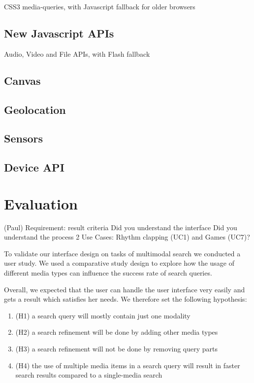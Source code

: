 \documentclass[runningheads,a4paper]{llncs} \usepackage[utf8]{inputenc}
\begin{document}
CSS3 media-queries, with Javascript fallback for older browsers

\subsection{New Javascript APIs}

 Audio, Video and File APIs, with Flash fallback

\subsection{Canvas}

\subsection{Geolocation}

\subsection{Sensors}

\subsection{Device API}


\section{Evaluation}
(Paul)
Requirement: result criteria
Did you understand the interface
Did you understand the process
2 Use Cases: Rhythm clapping (UC1) and Games (UC7)?

To validate our interface design on tasks of multimodal search we conducted a user study. 
We used a comparative study design to explore how the usage of different media types can 
influence the success rate of search queries. 

Overall, we expected that the user can handle the user interface very easily and gets a 
result which satisfies her needs. We therefore set the following hypothesis: 
\begin{enumerate}
  \item (H1) a search query will mostly contain just one modality
  \item (H2) a search refinement will be done by adding other media types
  \item (H3) a search refinement will not be done by removing query parts
  \item (H4) the use of multiple media items in a search query will result
  in faster search results compared to a single-media search
\end{enumerate}
\end{document}
